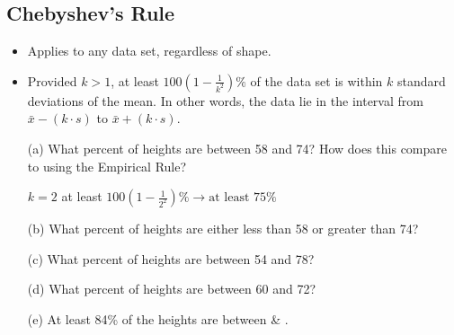 \documentclass{report}
\begin{document}
\subsection{Chebyshev's Rule}
\bigbreak \noindent
\begin{itemize}
    \item Applies to any data set, regardless of shape.
    
    \vspace{1em}
    
    \item Provided \( k > 1 \), at least \( 100 \left(1 - \frac{1}{k^2}\right) \% \) of the data set is within \( k \) standard deviations of the mean. In other words, the data lie in the interval from \( \bar{x} - (k \cdot s) \) to \( \bar{x} + (k \cdot s) \).
    
    \vspace{1em}
\end{itemize}
\bigbreak \noindent
\begin{enumerate} %
    \item[(a)] What percent of heights are between 58 and 74? 
      \vspace{1mm}
    How does this compare to using the Empirical Rule?
    \vspace{2mm} 

    $ k = 2 $  \hspace{10mm} at least $100(1-\frac{1}{2^2})\% \rightarrow \text{at least 75\%}$
    \vspace{1em}
    
    \item[(b)] What percent of heights are either less than 58 or greater than 74?
    
    \vspace{1em}
    
    \item[(c)] What percent of heights are between 54 and 78?
    
    \vspace{1em}
    
    \item[(d)] What percent of heights are between 60 and 72?
    
    \vspace{1em}
    
    \item[(e)] At least 84\% of the heights are between \underline{\hspace{1cm}} \& \underline{\hspace{1cm}}.
    
    \vspace{1em}
\end{enumerate}
\end{document}
